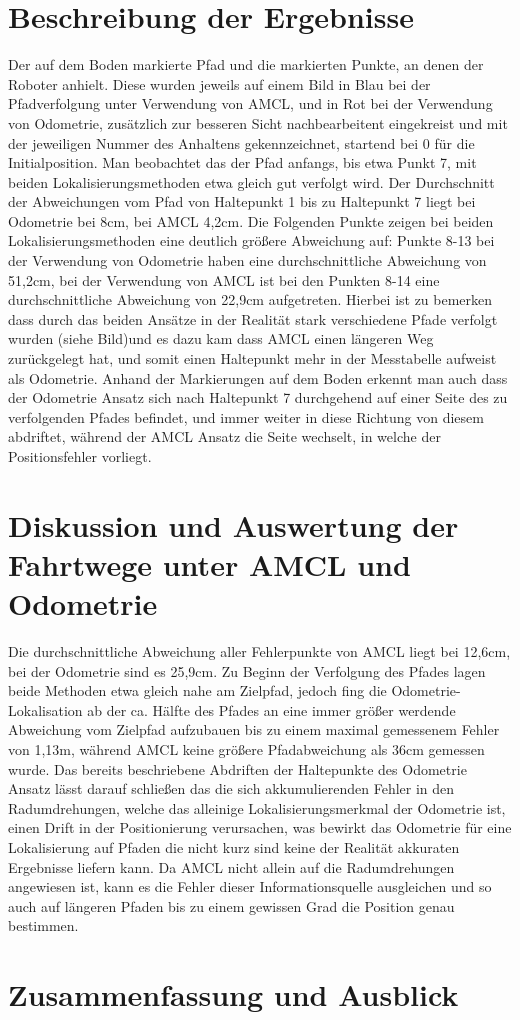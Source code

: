 \documentclass[11pt,a4paper]{article}
\begin{document}
\section{Beschreibung der Ergebnisse}
Der auf dem Boden markierte Pfad und die markierten Punkte, an denen der Roboter anhielt. Diese wurden jeweils auf einem Bild in Blau bei der Pfadverfolgung 
unter Verwendung von AMCL, und in Rot bei der Verwendung von Odometrie, zusätzlich zur besseren Sicht nachbearbeitent eingekreist und mit der jeweiligen Nummer 
des Anhaltens gekennzeichnet, startend bei 0 für die Initialposition.
Man beobachtet das der Pfad anfangs, bis etwa Punkt 7, mit beiden Lokalisierungsmethoden etwa gleich gut verfolgt wird. Der Durchschnitt der Abweichungen vom Pfad 
von Haltepunkt 1 bis zu Haltepunkt 7 liegt bei Odometrie bei 8cm, bei AMCL 4,2cm. Die Folgenden Punkte zeigen bei beiden Lokalisierungsmethoden eine deutlich 
größere Abweichung auf: Punkte 8-13 bei der Verwendung von Odometrie haben eine durchschnittliche Abweichung von 51,2cm, bei der Verwendung von AMCL ist bei den 
Punkten 8-14 eine durchschnittliche Abweichung von 22,9cm aufgetreten. Hierbei ist zu bemerken dass durch das beiden Ansätze in der Realität stark 
verschiedene Pfade verfolgt wurden (siehe Bild)und es dazu kam dass AMCL einen längeren Weg zurückgelegt hat, und somit einen Haltepunkt mehr in der Messtabelle 
aufweist als Odometrie.  Anhand der Markierungen auf dem Boden erkennt man auch dass der Odometrie Ansatz sich nach Haltepunkt 7 durchgehend auf einer Seite des 
zu verfolgenden Pfades befindet, und immer weiter in diese Richtung von diesem abdriftet, während der AMCL Ansatz die Seite wechselt, in welche der Positionsfehler vorliegt.

\section{Diskussion und Auswertung der Fahrtwege unter AMCL und Odometrie}
Die durchschnittliche Abweichung aller Fehlerpunkte von AMCL liegt bei 12,6cm, bei der Odometrie sind es 25,9cm. Zu Beginn der Verfolgung des Pfades lagen beide Methoden 
etwa gleich nahe am Zielpfad, jedoch fing die Odometrie-Lokalisation  ab der ca. Hälfte des Pfades an eine immer größer werdende Abweichung vom Zielpfad aufzubauen bis 
zu einem maximal gemessenem Fehler von 1,13m,  während AMCL keine größere Pfadabweichung als 36cm gemessen wurde. Das bereits beschriebene Abdriften der 
Haltepunkte des Odometrie Ansatz lässt darauf schließen das die sich akkumulierenden Fehler in den Radumdrehungen, welche das alleinige Lokalisierungsmerkmal 
der Odometrie ist, einen Drift in der Positionierung verursachen, was bewirkt das Odometrie für eine Lokalisierung auf Pfaden die nicht kurz sind keine der Realität 
akkuraten Ergebnisse liefern kann. Da AMCL nicht allein auf die Radumdrehungen angewiesen ist, kann es die Fehler dieser Informationsquelle ausgleichen und so auch auf 
längeren Pfaden bis zu einem gewissen Grad die Position genau bestimmen.

\section{Zusammenfassung und Ausblick}

{%

}
\end{document}
